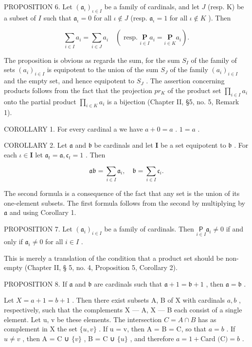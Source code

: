 PROPOSITION 6. Let \((\mathfrak{a}_{\iota})_{\iota \in I}\) be a family of cardinals, and let \(J\) (resp. K) be a subset of \(I\) such that \(\mathfrak{a}_{\iota} = 0\) for all \(\iota \notin J\) (resp. \(\mathfrak{a}_{\iota} = 1\) for all \(\iota \notin K\) ). Then

\[
\sum_ {i \in I} a _ {i} = \sum_ {i \in J} a _ {i} \quad \left(\text { resp. } \underset {i \in I} {\mathbf {P}} a _ {i} = \underset {i \in K} {\mathbf {P}} a _ {i}\right).
\]

The proposition is obvious as regards the sum, for the sum \(S_{I}\) of the family of sets \((a_{i})_{i\in I}\) is equipotent to the union of the sum \(S_{J}\) of the family \((a_{i})_{i\in I}\) and the empty set, and hence equipotent to \(S_{J}\) . The assertion concerning products follows from the fact that the projection \(pr_{K}\) of the product set \(\prod_{i\in I} a_{i}\) onto the partial product \(\prod_{i\in K} a_{i}\) is a bijection (Chapter II, §5, no. 5, Remark 1).

COROLLARY 1. For every cardinal a we have \(a + 0 = a\) . \(1 = a\) .

COROLLARY 2. Let \(\mathfrak{a}\) and \(\mathfrak{b}\) be cardinals and let \(\mathbf{I}\) be a set equipotent to \(\mathfrak{b}\) . For each \(\iota \in \mathbf{I}\) let \(\mathfrak{a}_t = \mathfrak{a}, \mathfrak{c}_t = 1\) . Then

\[
\mathfrak {a}\mathfrak {b} = \sum_ {i \in I} \mathfrak {a} _ {i}, \quad \mathfrak {b} = \sum_ {i \in I} \mathfrak {c} _ {i}.
\]

The second formula is a consequence of the fact that any set is the union of its one-element subsets. The first formula follows from the second by multiplying by \(\mathfrak{a}\) and using Corollary 1.

PROPOSITION 7. Let \((\mathfrak{a}_{i})_{i\in I}\) be a family of cardinals. Then \(\underset{i\in I}{\mathsf{P}}\mathfrak{a}_{i}\neq 0\) if and only if \(\mathfrak{a}_i\neq 0\) for all \(i\in I\) .

This is merely a translation of the condition that a product set should be non-empty (Chapter II, § 5, no. 4, Proposition 5, Corollary 2).

PROPOSITION 8. If \(\mathfrak{a}\) and \(\mathfrak{b}\) are cardinals such that \(\mathfrak{a} + 1 = \mathfrak{b} + 1\) , then \(\mathfrak{a} = \mathfrak{b}\) .

Let \(X = a + 1 = b + 1\) . Then there exist subsets A, B of X with cardinals \(a, b\) , respectively, such that the complements X --- A, X --- B each consist of a single element. Let u, v be these elements. The intersection \(C = A \cap B\) has as complement in X the set \(\{u, v\}\) . If u = v, then A = B = C, so that \(a = b\) . If \(u \neq v\) , then A = C ∪ \(\{v\}\) , B = C ∪ \(\{u\}\) , and therefore \(a = 1 + \text{Card (C)} = b\) .

